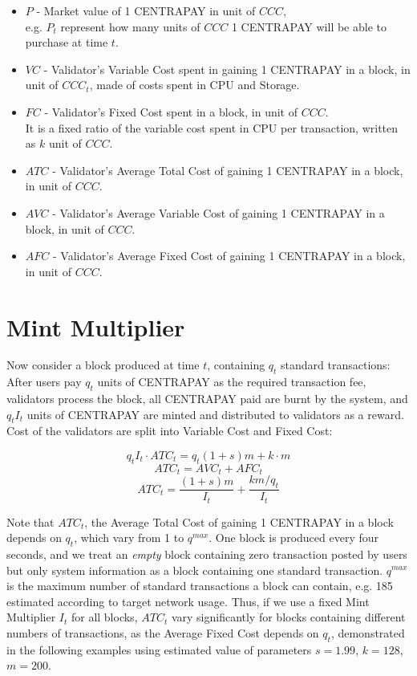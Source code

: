 \documentclass{article}
\begin{document}
\begin{itemize}
  \item $P$ - Market value of 1 CENTRAPAY in unit of \textbf{$CCC$}, \\
  e.g. $P_t$ represent how many units of $CCC$ 1 CENTRAPAY will be able to purchase at time $t$.

  \item $VC$ - Validator's Variable Cost spent in gaining 1 CENTRAPAY in a block, in unit of $CCC_t$, made of costs spent in CPU and Storage.

  \item $FC$ - Validator's Fixed Cost spent in a block, in unit of $CCC$.\\
  It is a fixed ratio of the variable cost spent in CPU per transaction, written as $k$ unit of $CCC$.

  \item $ATC$ - Validator's Average Total Cost of gaining 1 CENTRAPAY in a block, in unit of $CCC$.
  
  \item $AVC$ - Validator's Average Variable Cost of gaining 1 CENTRAPAY in a block, in unit of $CCC$.
  
  \item $AFC$ - Validator's Average Fixed Cost of gaining 1 CENTRAPAY in a block, in unit of $CCC$.

  
 \end{itemize}

\section{Mint Multiplier}
Now consider a block produced at time $t$, containing $q_t$ standard transactions:\\
After users pay $q_t$ units of CENTRAPAY as the required transaction fee, validators process the block, all CENTRAPAY paid are burnt by the system, and $q_tI_t$ units of CENTRAPAY are minted and distributed to validators as a reward. Cost of the validators are split into Variable Cost and Fixed Cost:

$$q_tI_t\cdot ATC_t=q_t(1+s)m + k\cdot m$$
$$ATC_t=AVC_t + AFC_t$$
$$ATC_t=\frac{(1+s)m}{I_t} + \frac{km/q_t}{I_t}$$

Note that $ATC_t$, the Average Total Cost of gaining 1 CENTRAPAY in a block depends on $q_t$, which vary from 1 to $q^{max}$. One block is produced every four seconds, and we treat an \textit{empty} block containing zero transaction posted by users but only system information as a block containing one standard transaction. $q^{max}$ is the maximum number of standard transactions a block can contain, e.g. 185 estimated according to target network usage. Thus, if we use a fixed Mint Multiplier $I_t$ for all blocks, $ATC_t$ vary significantly for blocks containing different numbers of transactions, as the Average Fixed Cost depends on $q_t$, demonstrated in the following examples using estimated value of parameters $s=1.99$, $k=128$, $m=200$. 
\end{document}

